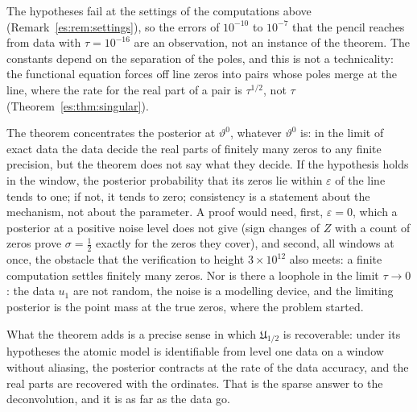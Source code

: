 The hypotheses fail at the settings of the computations above (Remark~\ref{es:rem:settings}), so the errors of $10^{-10}$ to $10^{-7}$ that the pencil reaches from data with $\tau=10^{-16}$ are an observation, not an instance of the theorem. The constants depend on the separation of the poles, and this is not a technicality: the functional equation forces off line zeros into pairs whose poles merge at the line, where the rate for the real part of a pair is $\tau^{1/2}$, not $\tau$ (Theorem~\ref{es:thm:singular}).

The theorem concentrates the posterior at $\vartheta^0$, whatever $\vartheta^0$ is: in the limit of exact data the data decide the real parts of finitely many zeros to any finite precision, but the theorem does not say what they decide. If the hypothesis holds in the window, the posterior probability that its zeros lie within $\varepsilon$ of the line tends to one; if not, it tends to zero; consistency is a statement about the mechanism, not about the parameter. A proof would need, first, $\varepsilon=0$, which a posterior at a positive noise level does not give (sign changes of $Z$ with a count of zeros prove $\sigma=\tfrac12$ exactly for the zeros they cover), and second, all windows at once, the obstacle that the verification to height $3\times10^{12}$ also meets: a finite computation settles finitely many zeros. Nor is there a loophole in the limit $\tau\to0$: the data $u_1$ are not random, the noise is a modelling device, and the limiting posterior is the point mass at the true zeros, where the problem started.

What the theorem adds is a precise sense in which $\mathfrak U_{1/2}$ is recoverable: under its hypotheses the atomic model is identifiable from level one data on a window without aliasing, the posterior contracts at the rate of the data accuracy, and the real parts are recovered with the ordinates. That is the sparse answer to the deconvolution, and it is as far as the data go.
